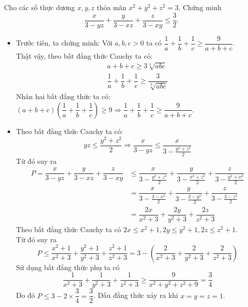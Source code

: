 \begin{ex}%
    Cho các số thực dương $x,y,z$ thỏa mãn $x^2+y^2+z^2=3$. Chứng minh $$\dfrac{x}{3-yz}+\dfrac{y}{3-xz} + \dfrac{z}{3-xy} \leq \dfrac{3}{2}.$$
\loigiai
    {\begin{itemize}
    	\item Trước tiên, ta chứng minh: Với $a,b,c>0$ ta có 
    	$\dfrac{1}{a} + \dfrac{1}{b} +\dfrac{1}{c} \geq \dfrac{9}{a+b+c}$.
    	\\ Thật vậy, theo bất đẳng thức Cauchy ta có:
    	\begin{align*}
    	a+b+c \geq 3\sqrt[3]{abc} \\ \dfrac{1}{a} +\dfrac{1}{b} + \dfrac{1}{c} \geq \dfrac{3}{\sqrt[3]{abc}}
    	\end{align*}
    	Nhân hai bất đẳng thức ta có: $(a+b+c)\left(\dfrac{1}{a} + \dfrac{1}{b} +\dfrac{1}{c}\right) \geq 9 \Rightarrow \dfrac{1}{a} + \dfrac{1}{b} +\dfrac{1}{c} \geq \dfrac{9}{a+b+c}.$
    	\item Theo bất đẳng thức Cauchy ta có: 
    	$$yz \leq \dfrac{y^2+z^2}{2} \Rightarrow \dfrac{x}{3-yz} \leq \dfrac{x}{3-\frac{y^2+z^2}{2}}$$
    	Từ đó suy ra
    	\begin{align*}
    	P=\dfrac{x}{3-yz}+\dfrac{y}{3-xz} + \dfrac{z}{3-xy} & \leq \dfrac{x}{3-\frac{y^2+z^2}{2}} + \dfrac{y}{3-\frac{x^2+z^2}{2}} + \dfrac{z}{3-\frac{y^2+x^2}{2}}\\
    	& = \dfrac{x}{3-\frac{3-x^2}{2}} + \dfrac{y}{3-\frac{3-y^2}{2}} + \dfrac{z}{3-\frac{3-z^2}{2}} \\ 
    	& = \dfrac{2x}{x^2+3} + \dfrac{2y}{y^2+3} + \dfrac{2z}{z^2+3} 
    	\end{align*}
    	Theo bất đẳng thức Cauchy ta có $2x \leq x^2+1, 2y \leq y^2+1, 2z \leq z^2+1$. 
    	\\ Từ đó suy ra 
    	$$P \leq \dfrac{x^2+1}{x^2+3} + \dfrac{y^2+1}{y^2+3} + \dfrac{z^2+1}{z^2+3}=3-\left( \dfrac{2}{x^2+3} + \dfrac{2}{y^2+3} + \dfrac{2}{z^2+3} \right)$$
    	Sử dụng bất đẳng thức phụ ta có
    	$$\dfrac{1}{x^2+3} + \dfrac{1}{y^2+3} + \dfrac{1}{z^2+3} \geq \dfrac{9}{x^2+y^2+z^2+9} = \dfrac{3}{4}$$
    	Do đó $P \leq 3 - 2\times \dfrac{3}{4} = \dfrac{3}{2}$. Dấu đẳng thức xảy ra khi $x=y=z=1$.
     \end{itemize}
    }
\end{ex}

